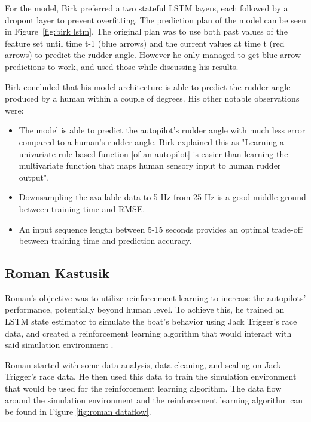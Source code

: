 \documentclass[12pt,twoside]{report}
\begin{document}
For the model, Birk preferred a two stateful LSTM layers, each followed by a dropout layer to prevent overfitting. The prediction plan of the model can be seen in Figure~\ref{fig:birk lstm}. The original plan was to use both past values of the feature set until time t-1 (blue arrows) and the current values at time t (red arrows) to predict the rudder angle. However he only managed to get blue arrow predictions to work, and used those while discussing his results.

Birk concluded that his model architecture is able to predict the rudder angle produced by a human within a couple of degrees. His other notable observations were: 
\begin{itemize}
  \item The model is able to predict the autopilot's rudder angle with much less error compared to a human's rudder angle. Birk explained this as "Learning a univariate rule-based function [of an autopilot] is easier than learning the multivariate function that maps human sensory input to human rudder output".
  \item Downsampling the available data to 5 Hz from 25 Hz is a good middle ground between training time and RMSE. 
  \item An input sequence length between 5-15 seconds provides an optimal trade-off between training time and prediction accuracy.
\end{itemize} 

\subsection{Roman Kastusik}
Roman's objective was to utilize reinforcement learning to increase the autopilots' performance, potentially beyond human level. To achieve this, he trained an LSTM state estimator to simulate the boat's behavior using Jack Trigger's race data, and created a reinforcement learning algorithm that would interact with said simulation environment \cite{roman}.

Roman started with some data analysis, data cleaning, and scaling on Jack Trigger's race data. He then used this data to train the simulation environment that would be used for the reinforcement learning algorithm. The data flow around the simulation environment and the reinforcement learning algorithm can be found in Figure \ref{fig:roman dataflow}.
\end{document}
